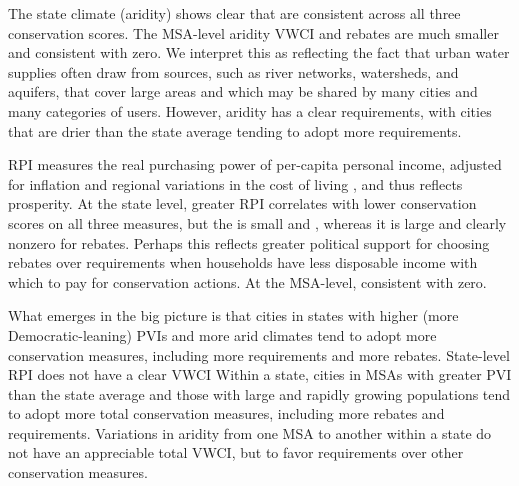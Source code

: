 \documentclass[draft,linenumbers]{agujournal}
\begin{document}
The state climate (aridity) shows clear
%
that are consistent across all three conservation scores.
The
MSA-level aridity
VWCI and rebates are much
smaller
and consistent with zero.
We interpret this as reflecting the fact that urban water supplies often draw from
sources, such as river networks, watersheds, and aquifers, that cover large areas
and which may be shared by many cities and many categories of users.
However, aridity has a clear
requirements, with cities that are
drier than the state average tending to adopt more requirements.

RPI measures the real purchasing power of per-capita personal income,
adjusted for inflation and regional variations in the cost of living
\citep{bea:rpp.methodology:2016}, and thus reflects prosperity.
At the state level, greater RPI correlates with lower conservation scores on
all three measures, but the
%
is small and
,
whereas it is large and clearly nonzero for rebates.
Perhaps this reflects greater political support for choosing rebates over
requirements when households have less disposable income with which to pay for
conservation actions.
At the MSA-level,
consistent with zero.

What emerges in the big picture is that cities in states with higher
(more Democratic-leaning) PVIs and more arid climates tend to adopt more
conservation measures, including more requirements and more rebates.
State-level RPI does not have a clear
%
VWCI%
Within a state, cities in MSAs with greater PVI than the state average and those
with large and rapidly growing populations tend to adopt more total conservation
measures, including more rebates and requirements.
Variations in aridity from one MSA to another within a state do not have an appreciable
total VWCI, but
to favor requirements over other conservation measures.
\end{document}

